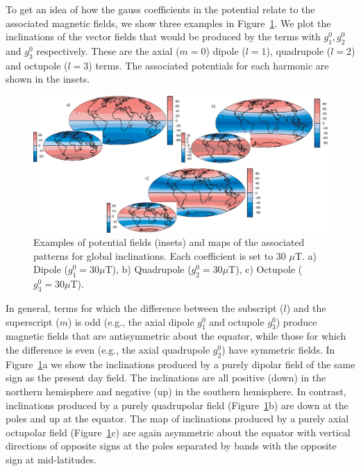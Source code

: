 To get an idea of how the  gauss coefficients in the potential relate to the associated magnetic fields, we show three examples 
 in  Figure~\ref{fig:harmonics}.  We plot the inclinations of the vector fields   that would be produced by the terms with $g_1^0, g_2^0$ and $g_3^0$ respectively.  
 These are the axial ($m=0$)  dipole ($l=1$), quadrupole ($l=2$) and octupole ($l=3$) terms. 
The  associated potentials for each harmonic  are shown in the   insets.  
 
 \begin{figure}[htb]
\centering  \includegraphics[width=14.5 cm]{EPSfiles/harmonics.eps}
\caption{Examples of potential fields (insets)  and maps of  the associated patterns for global inclinations.  Each coefficient is set to 30 $\mu$T.   a) Dipole ($g_1^0=30 \mu$T), b) Quadrupole ($g_2^0=30 \mu$T), c) Octupole ($g_3^0=30 \mu$T).    }
\label{fig:harmonics}
\end{figure}


  In general, terms for which the difference between the subscript ($l$) and the superscript ($m$) is odd (e.g., the axial dipole $g_1^0$ and octupole $g_3^0$)  produce magnetic fields that are antisymmetric about the equator, while those for which the difference is even (e.g., the axial quadrupole $g_2^0$) have symmetric fields.  In Figure~\ref{fig:harmonics}a we show the inclinations produced by a purely dipolar field of the same sign as the present day field.  The inclinations are all positive (down) in the northern hemisphere and negative (up) in the southern hemisphere.  In contrast, inclinations produced by a purely quadrupolar field (Figure~\ref{fig:harmonics}b) are down at the poles and up at the equator.    The map of inclinations produced by a purely axial octupolar field (Figure~\ref{fig:harmonics}c) are again asymmetric about the equator  with  vertical directions of opposite signs at the poles separated by bands with the opposite sign at mid-latitudes.    

